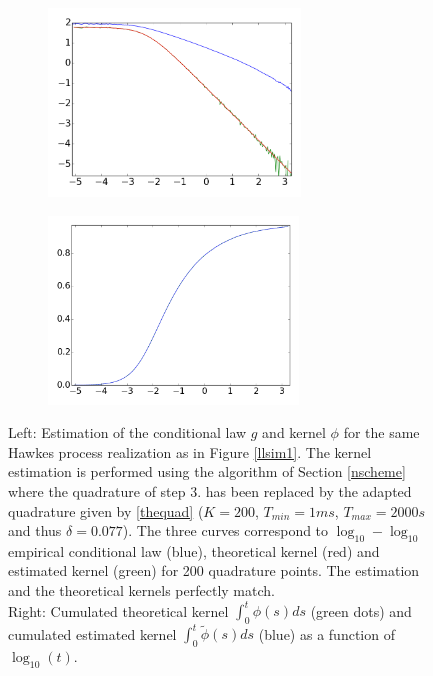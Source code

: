 \documentclass[a4paper,11pt]{article}
\begin{document}
\begin{figure}[H]
\centering
        \begin{subfigure}[b]{0.49\textwidth}
                \includegraphics[width=\textwidth,height=50mm]{logloglin.png}
        \end{subfigure}
        \begin{subfigure}[b]{0.49\textwidth}
                \includegraphics[width=\textwidth,height=50mm]{cumlin.png}
        \end{subfigure}
        \caption{Left: Estimation of the conditional law $g$ and kernel $\phi$ for the same Hawkes process realization
as in Figure \ref{llsim1}.
The kernel estimation is performed using the algorithm of Section \ref{nscheme}
where the quadrature of step 3. has been replaced by
the adapted quadrature given by \eqref{thequad} ($K=200$, $T_{min}=1ms$, $T_{max}=2000s$ and thus $\delta=0.077$). The three curves correspond to
$\log_{10}-\log_{10}$ empirical conditional law  (blue), theoretical kernel (red) and estimated kernel (green) for 200 quadrature points. The estimation and the theoretical kernels perfectly match.\\
Right: Cumulated theoretical kernel $\int_0^t\phi(s)ds$ (green dots) and cumulated estimated kernel $\int_0^t\tilde{\phi}(s)ds$ (blue) as a function of $\log_{10}(t)$.}
\label{linscheme}
\end{figure}
\end{document}
